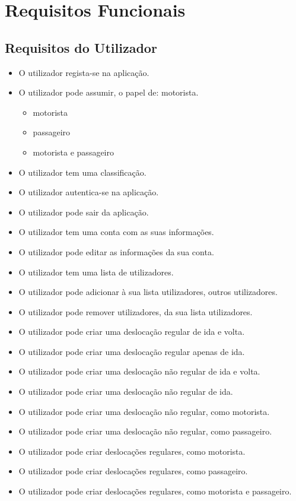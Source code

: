 \chapter{Requisitos Funcionais}

\section{Requisitos do Utilizador}

\begin{itemize}
    \item O utilizador regista-se na aplicação.
    
    \item O utilizador pode assumir, o papel de: motorista.
    \begin{itemize}
        \item motorista
        \item passageiro
        \item motorista e passageiro
    \end{itemize}{}

    \item O utilizador tem uma classificação.
    
    \item O utilizador autentica-se na aplicação.
    \item O utilizador pode sair da aplicação.
    
    \item O utilizador tem uma conta com as suas informações.
    \item O utilizador pode editar as informações da sua conta.
    \item O utilizador tem uma lista de utilizadores.
    \item O utilizador pode adicionar à sua lista utilizadores, outros utilizadores.
    \item O utilizador pode remover utilizadores, da sua lista utilizadores.
    
    \item O utilizador pode criar uma deslocação regular de ida e volta.
    \item O utilizador pode criar uma deslocação regular apenas de ida.
    \item O utilizador pode criar uma deslocação não regular de ida e volta.
    \item O utilizador pode criar uma deslocação não regular de ida.
    \item O utilizador pode criar uma deslocação não regular, como motorista.
    \item O utilizador pode criar uma deslocação não regular, como passageiro.
    \item O utilizador pode criar deslocações regulares, como motorista.
    \item O utilizador pode criar deslocações regulares, como passageiro.
    \item O utilizador pode criar deslocações regulares, como motorista e passageiro.
    

\end{itemize}
